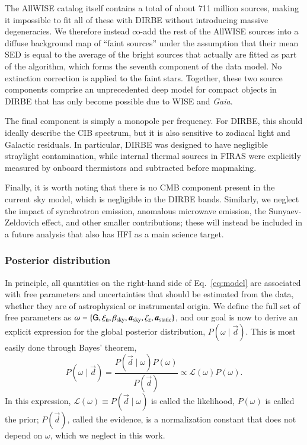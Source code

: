 \documentclass{aa}
\def\Planck{\textit{Planck}}
\def\GAIA{\textit{Gaia}}
\newcommand{\dv}[0]{\vec{d}}
\newcommand{\G}[0]{\tens{G}}
\renewcommand{\a}[0]{\vec{a}}
\begin{document}
The AllWISE catalog itself contains a total of about 711 million
sources, making it impossible to fit all of these with DIRBE without
introducing massive degeneracies. We therefore instead co-add the rest
of the AllWISE sources into a diffuse background map of ``faint sources''
under the assumption that their mean SED is equal to the average of
the bright sources that actually are fitted as part of the
algorithm, {which forms the seventh component of the data model. No
extinction correction is applied to the faint stars.} Together, these {two} source components comprise an
unprecedented deep model for compact objects in DIRBE that has only
become possible due to WISE and \GAIA.

The final component is simply a monopole per frequency. For
DIRBE, this should ideally describe the CIB spectrum, but it
is also sensitive to zodiacal light and Galactic residuals. {In particular}, DIRBE was designed to have negligible straylight contamination, while internal thermal sources in FIRAS were explicitly measured by onboard thermistors and subtracted before mapmaking.

Finally, it is worth noting that there is no CMB component present in
the current sky model, which is negligible in the DIRBE bands.
Similarly, we neglect the impact of synchrotron emission,
anomalous microwave emission, the Sunyaev-Zeldovich effect, and other
smaller contributions; these will instead be included in a future
analysis that also has HFI as a main science target.

\subsubsection{Posterior distribution}

In principle, all quantities on the right-hand side of
Eq.~\eqref{eq:model} are associated with free parameters and
uncertainties that should be estimated from the data, whether they are
of astrophysical or instrumental origin. We define the full set of
free parameters as $\omega = \{\G,\xi_{\mathrm{n}},
\beta_{\mathrm{sky}},\a_{\mathrm{sky}},\zeta_{\mathrm{z}},\a_{\mathrm{static}}\}$,
and our goal is now to derive an explicit expression for the global
posterior distribution, $P(\omega\mid\dv)$. This is most easily done
through Bayes' theorem,
\begin{equation}
P(\omega\mid\dv) = \frac{P(\dv\mid\omega) P(\omega)}{P(\dv)} \propto
\mathcal{L}(\omega) P(\omega).
\end{equation}
In this expression, $\mathcal{L}(\omega) \equiv  P(\dv\mid\omega)$ is
called the likelihood, $P(\omega)$ is called the prior; $P(\dv)$, called the evidence, is a
normalization constant that does not depend on $\omega$, which we
neglect in this work.
\end{document}

